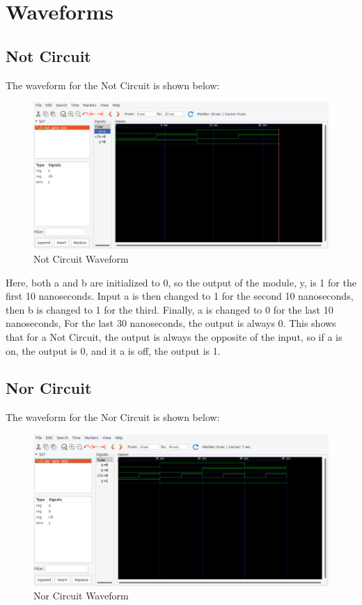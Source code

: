 \documentclass[runningheads, 12pt]{report}
\begin{document}
\pagebreak

\chapter{Waveforms}

	\section{Not Circuit}

The waveform for the Not Circuit is shown below:
\begin{figure}[h]
	\centering
	\includegraphics[width=1.0\textwidth]{not_gate_wf}
	\caption{Not Circuit Waveform}
	\label{fig: not_gate_wf}
\end{figure}

Here, both a and b are initialized to 0, so the output of the module, y, is 1 for the first 10 nanoseconds. Input a is then changed to 1 for the second 10 nanoseconds, then b is changed to 1 for the third. Finally, a is changed to 0 for the last 10 nanoseconds, For the last 30 nanoseconds, the output is always 0. This shows that for a Not Circuit, the output is always the opposite of the input, so if a is on, the output is 0, and it a is off, the output is 1. 
	\section{Nor Circuit}

The waveform for the Nor Circuit is shown below:
\begin{figure}[h]
	\centering
	\includegraphics[width=1.10\textwidth]{nor_gate_wf}
	\caption{Nor Circuit Waveform}
	\label{fig: nor_gate_wf}
\end{figure}
\end{document}
